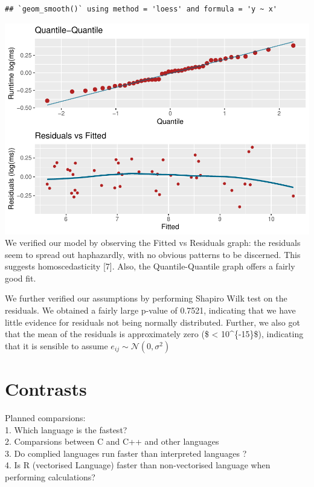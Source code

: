 \documentclass[12pt,halfline,a4paper,]{ouparticle}
\begin{document}
\begin{verbatim}
## `geom_smooth()` using method = 'loess' and formula = 'y ~ x'
\end{verbatim}

\includegraphics[width=1\linewidth]{skeleton_files/figure-latex/tableAnova-1}
We verified our model by observing the Fitted vs Residuals graph: the
residuals seem to spread out haphazardly, with no obvious patterns to be
discerned. This suggests homoscedasticity {[}7{]}. Also, the
Quantile-Quantile graph offers a fairly good fit.

We further verified our assumptions by performing Shapiro Wilk test on
the residuals. We obtained a fairly large p-value of 0.7521, indicating
that we have little evidence for residuals not being normally
distributed. Further, we also got that the mean of the residuals is
approximately zero (\$ \textless{} 10\^{}\{-15\}\$), indicating that it
is sensible to assume \(e_{ij} \sim \mathcal{N}(0, \sigma^2)\)

\hypertarget{contrasts}{%
\section{Contrasts}\label{contrasts}}

Planned comparsions:\\
1. Which language is the fastest?\\
2. Comparsions between C and C++ and other languages\\
3. Do complied languages run faster than interpreted languages ?\\
4. Is R (vectorised Language) faster than non-vectorised language when
performing calculations?
\end{document}
